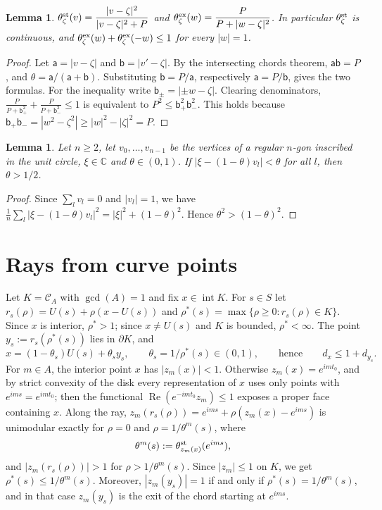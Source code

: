 \documentclass[11pt]{amsart}
\newtheorem{lemma}[theorem]{Lemma}
\theoremstyle{remark}
\newcommand{\C}{\mathbb{C}}
\newcommand{\re}{\operatorname{Re}}
\newcommand{\inter}{\operatorname{int}}
\begin{document}
\begin{lemma}\label{lem:chord}
$\theta^{\rm st}_\zeta(v)=\dfrac{|v-\zeta|^2}{|v-\zeta|^2+P}$ and $\theta^{\rm ex}_\zeta(w)=\dfrac{P}{P+|w-\zeta|^2}$. In particular
$\theta^{\rm st}_\zeta$ is continuous, and $\theta^{\rm ex}_\zeta(w)+\theta^{\rm ex}_\zeta(-w)\le1$ for every $|w|=1$.
\end{lemma}
\begin{proof}
Let $\mathsf a=|v-\zeta|$ and $\mathsf b=|v'-\zeta|$. By the intersecting chords theorem, $\mathsf a\mathsf b=P$, and $\theta=\mathsf a/(\mathsf a+\mathsf b)$. Substituting $\mathsf b=P/\mathsf a$,
respectively $\mathsf a=P/\mathsf b$, gives the two formulas. For the inequality write $\mathsf b_\pm=|\pm w-\zeta|$. Clearing denominators,
$\frac P{P+\mathsf b_+^2}+\frac P{P+\mathsf b_-^2}\le1$ is equivalent to $P^2\le \mathsf b_+^2\mathsf b_-^2$. This holds because
$\mathsf b_+\mathsf b_-=|w^2-\zeta^2|\ge|w|^2-|\zeta|^2=P$.
\end{proof}

\begin{lemma}\label{lem:avg}
Let $n\ge2$, let $v_0,\dots,v_{n-1}$ be the vertices of a regular $n$-gon inscribed in the unit circle, $\xi\in\C$ and $\theta\in(0,1)$.
If $|\xi-(1-\theta)v_l|<\theta$ for all $l$, then $\theta>1/2$.
\end{lemma}
\begin{proof}
Since $\sum_lv_l=0$ and $|v_l|=1$, we have $\frac1n\sum_l|\xi-(1-\theta)v_l|^2=|\xi|^2+(1-\theta)^2$. Hence $\theta^2>(1-\theta)^2$.
\end{proof}

\section{Rays from curve points}

Let $K=\mathcal C_A$ with $\gcd(A)=1$ and fix $x\in\inter K$. For $s\in S$ let $r_s(\rho)=U(s)+\rho(x-U(s))$ and $\rho^\ast(s)=\max\{\rho\ge0: r_s(\rho)\in K\}$.
Since $x$ is interior, $\rho^\ast>1$; since $x\ne U(s)$ and $K$ is bounded, $\rho^\ast<\infty$. The point $y_s:=r_s(\rho^\ast(s))$ lies in $\partial K$, and
\begin{equation}\label{eq:ray}
x=(1-\theta_s)U(s)+\theta_sy_s,\qquad\theta_s=1/\rho^\ast(s)\in(0,1),\qquad\text{hence}\qquad d_x\le1+d_{y_s}.
\end{equation}
For $m\in A$, the interior point $x$ has $|z_m(x)|<1$. Otherwise $z_m(x)=e^{imt_0}$, and by strict convexity of the disk every representation of $x$ uses only
points with $e^{ims}=e^{imt_0}$; then the functional $\re(e^{-imt_0}z_m)\le1$ exposes a proper face containing $x$. Along the ray,
$z_m(r_s(\rho))=e^{ims}+\rho(z_m(x)-e^{ims})$ is unimodular exactly for $\rho=0$ and $\rho=1/\theta^m(s)$, where
\[
\theta^m(s):=\theta^{\rm st}_{z_m(x)}(e^{ims}),
\]
and $|z_m(r_s(\rho))|>1$ for $\rho>1/\theta^m(s)$. Since $|z_m|\le1$ on $K$, we get $\rho^\ast(s)\le1/\theta^m(s)$. Moreover,
$|z_m(y_s)|=1$ if and only if $\rho^\ast(s)=1/\theta^m(s)$, and in that case $z_m(y_s)$ is the exit of the chord starting at $e^{ims}$.
\end{document}
